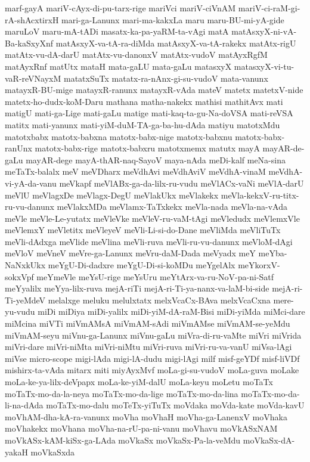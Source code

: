 {marf-gayA
mariV-cAyx-di-pu-tarx-rige
mariVci
mariV-ciVnAM
mariV-ci-raM-gi-rA-shAcxtirxH
mari-ga-Lanunx
mari-ma-kakxLa
maru
maru-BU-mi-yA-gide
maruLoV
maru-mA-tADi
masatx-ka-pa-yaRM-ta-vAgi
matA
matAsxyX-ni-vA-Ba-kaSxyXnf
matAsxyX-va-tA-ra-diMda
matAsxyX-va-tA-rakekx
matAtx-rigU
matAtx-vu-dA-darU
matAtx-vu-danonxV
matAtx-vudoV
matAyxRgfM
matAyxRnf
matUtx
mataH
mata-gaLU
mata-gaLu
matasxyX
matasxyX-vi-tu-vaR-reVNayxM
matatxSuTx
matatx-ra-nAnx-gi-su-vudoV
mata-vanunx
matayxR-BU-mige
matayxR-ranunx
matayxR-vAda
mateV
matetx
matetxV-nide
matetx-ho-dudx-koM-Daru
mathana
matha-nakekx
mathisi
mathitAvx
mati
matigU
mati-ga-Lige
mati-gaLu
matige
mati-kaq-ta-gu-Na-doVSA
mati-reVSA
matitx
mati-yanunx
mati-yiM-duM-TA-ga-ba-hu-dAda
matiyu
matotxMdu
matotxbabx
matotx-babxna
matotx-babx-nige
matotx-babxnu
matotx-babx-ranUnx
matotx-babx-rige
matotx-babxru
matotxmemx
matutx
mayA
mayAR-de-gaLu
mayAR-dege
mayA-thAR-naq-SayoV
maya-nAda
meDi-kalf
meNa-sina
meTaTx-balalx
meV
meVDharx
meVdhAvi
meVdhAviV
meVdhA-vinaM
meVdhA-vi-yA-da-vanu
meVkapf
meVlABx-ga-da-lilx-ru-vudu
meVlACx-vaNi
meVlA-darU
meVlU
meVlagxDe
meVlagx-DegU
meVlakUkx
meVlakekx
meVla-kekxV-ru-titx-ru-vu-danunx
meVlakxMDa
meVlamx-TaTxkekx
meVla-nada
meVla-na-vAda
meVle
meVle-Le-yutatx
meVleVke
meVleV-ru-vaM-tAgi
meVledudx
meVlemxVle
meVlemxY
meVletitx
meVleyeV
meVli-Li-si-do-Dane
meVliMda
meVliTuTx
meVli-dAdxga
meVlide
meVlina
meVli-ruva
meVli-ru-vu-danunx
meVloM-dAgi
meVloV
meVneV
meVre-ga-Lanunx
meVru-daM-Dada
meVyadx
meY
meYba-NaNxkUkx
meYgU-Di-dadxre
meYgU-Di-si-koMDu
meYgelAlx
meYkorxV-sokxVpf
meYmeVle
meYsU-rige
meYsUru
meYtArx-va-ru-NoV-pa-ni-Satf
meYyalilx
meYya-lilx-ruva
mejA-riTi
mejA-ri-Ti-ya-nanx-va-laM-bi-side
mejA-ri-Ti-yeMdeV
melalxge
meluku
melulxtatx
melxVcaCx-BAva
melxVcaCxna
mere-yu-vudu
miDi
miDiya
miDi-yalilx
miDi-yiM-dA-raM-Bisi
miDi-yiMda
miMci-dare
miMcina
miVTi
miVmAMsA
miVmAM-sAdi
miVmAMse
miVmAM-se-yeMdu
miVmAM-seyu
miVnu-ga-Lanunx
miVnu-gaLu
miVra-di-ru-vaMte
miVri
miVrida
miVri-dare
miVri-niMta
miVri-niMtu
miVri-ruva
miVri-ru-va-vanU
miVsa-lAgi
miVse
micro-scope
migi-lAda
migi-lA-dudu
migi-lAgi
milf
misf-geYDf
misf-liVDf
mishirx-ta-vAda
mitarx
miti
miyAyxMvf
moLa-gi-su-vudoV
moLa-guva
moLake
moLa-ke-ya-lilx-deVpapx
moLa-ke-yiM-dalU
moLa-keyu
moLetu
moTaTx
moTaTx-mo-da-la-neya
moTaTx-mo-da-lige
moTaTx-mo-da-lina
moTaTx-mo-da-li-na-dAda
moTaTx-mo-dalu
moTeTx-yiTuTx
moVdaka
moVda-kate
moVda-kavU
moVhAM-dha-kA-ra-vanunx
moVha
moVhaH
moVha-ga-LanenxV
moVhaka
moVhakekx
moVhana
moVha-na-rU-pa-ni-vanu
moVhavu
moVkASxNAM
moVkASx-kAM-kiSx-ga-LAda
moVkaSx
moVkaSx-Pa-la-veMdu
moVkaSx-dA-yakaH
moVkaSxda
}
